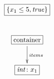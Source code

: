$\xymatrix{
  \fbox{$\{x_1 \leq 5, \mathit{true}\}$}  \\
  \fbox{container} \ar[d]^{items} \\
  \fbox{$\mathit{int}\colon x_1$}
}$
